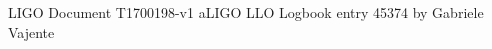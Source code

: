 \begin{thebibliography}{2}
 LIGO Document T1700198-v1
 aLIGO LLO Logbook entry 45374 by Gabriele Vajente
\end{thebibliography}

